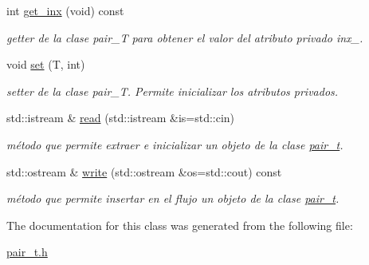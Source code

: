 \begin{DoxyCompactItemize}
\mbox{\label{classpair__t_a39151bf167430e9330c937aabe2868a5}} 
int \hyperlink{classpair__t_a39151bf167430e9330c937aabe2868a5}{get\+\_\+inx} (void) const
\begin{DoxyCompactList}\small\item\em getter de la clase pair\+\_\+T para obtener el valor del atributo privado inx\+\_\+. \end{DoxyCompactList}\item 
\mbox{\label{classpair__t_a669384d2815265994bd2d07963dae390}} 
void \hyperlink{classpair__t_a669384d2815265994bd2d07963dae390}{set} (T, int)
\begin{DoxyCompactList}\small\item\em setter de la clase pair\+\_\+T. Permite inicializar los atributos privados. \end{DoxyCompactList}\item 
\mbox{\label{classpair__t_a51d683adb6b939b3b175fe5dbe315664}} 
std\+::istream \& \hyperlink{classpair__t_a51d683adb6b939b3b175fe5dbe315664}{read} (std\+::istream \&is=std\+::cin)
\begin{DoxyCompactList}\small\item\em método que permite extraer e inicializar un objeto de la clase \hyperlink{classpair__t}{pair\+\_\+t}. \end{DoxyCompactList}\item 
\mbox{\label{classpair__t_aaeef375bbb02cba17ff4862cdd2cf324}} 
std\+::ostream \& \hyperlink{classpair__t_aaeef375bbb02cba17ff4862cdd2cf324}{write} (std\+::ostream \&os=std\+::cout) const
\begin{DoxyCompactList}\small\item\em método que permite insertar en el flujo un objeto de la clase \hyperlink{classpair__t}{pair\+\_\+t}. \end{DoxyCompactList}\end{DoxyCompactItemize}


The documentation for this class was generated from the following file\+:\begin{DoxyCompactItemize}
\item 
\hyperlink{pair__t_8h}{pair\+\_\+t.\+h}\end{DoxyCompactItemize}
